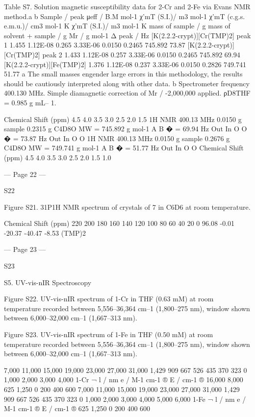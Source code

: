 Table S7. Solution magnetic susceptibility data for 2-Cr and 2-Fe via Evans NMR method.a 
b Sample / peak 
μeff / B.M 
mol-1 
χ'mT (S.I.)/ 
m3 mol-1 
χ'mT (c.g.s. e.m.u.)/ 
cm3 mol-1 K 
χ'mT (S.I.)/ m3 
mol-1 K 
mass of 
sample / g 
mass of solvent 
+ sample / g 
Mr / g 
mol-1 
Δ peak / 
Hz 
[K(2.2.2-crypt)][Cr(TMP)2] peak 1 
1.455 
1.12E-08 
0.265 
3.33E-06 
0.0150 
0.2465 
745.892 
73.87 
[K(2.2.2-crypt)][Cr(TMP)2] peak 2 
1.433 
1.12E-08 
0.257 
3.33E-06 
0.0150 
0.2465 
745.892 
69.94 
[K(2.2.2-crypt)][Fe(TMP)2] 
1.376 
1.12E-08 
0.237 
3.33E-06 
0.0150 
0.2826 
749.741 
51.77 
a The small masses engender large errors in this methodology, the results should be cautiously interpreted along with other 
data. b Spectrometer frequency 400.130 MHz. Simple diamagnetic correction of Mr / -2,000,000 applied. ρD8THF = 0.985 g mL–
1. 
 
Chemical Shift (ppm)
4.5
4.0
3.5
3.0
2.5
2.0
1.5
1H NMR 400.13 MHz
0.0150 g sample
0.2315 g C4D8O
MW = 745.892 g mol-1
A
B
� = 69.94 Hz
Out
In
O
O
� = 73.87 Hz
Out
In
O
O
1H NMR 400.13 MHz
0.0150 g sample
0.2676 g C4D8O
MW = 749.741 g mol-1
A
B
� = 51.77 Hz
Out
In
O
O
Chemical Shift (ppm)
4.5
4.0
3.5
3.0
2.5
2.0
1.5
1.0


--- Page 22 ---
 
 
S22 
 
 
 
Figure S21. 31P{1H} NMR spectrum of crystals of 7 in C6D6 at room temperature. 
 
 
Chemical Shift (ppm)
220
200
180
160
140
120
100
80
60
40
20
0
96.08
-0.01
-20.37
-40.47
-8.53
(TMP)2


--- Page 23 ---
 
 
S23 
 
 
S5. UV-vis-nIR Spectroscopy 
 
Figure S22. UV-vis-nIR spectrum of 1-Cr in THF (0.63 mM) at room temperature recorded between 5,556–36,364 cm–1 
(1,800–275 nm), window shown between 6,000–32,000 cm–1 (1,667–313 nm). 
 
 
Figure S23. UV-vis-nIR spectrum of 1-Fe in THF (0.50 mM) at room temperature recorded between 5,556–36,364 cm–1 
(1,800–275 nm), window shown between 6,000–32,000 cm–1 (1,667–313 nm). 
 
7,000
11,000
15,000
19,000
23,000
27,000
31,000
1,429
909
667
526
435
370
323
0
1,000
2,000
3,000
4,000
1-Cr
¬ l / nm
e / M-1 cm-1 ®
E / cm-1 ®
16,000
8,000
625
1,250
0
200
400
600
7,000
11,000
15,000
19,000
23,000
27,000
31,000
1,429
909
667
526
435
370
323
0
1,000
2,000
3,000
4,000
5,000
6,000
1-Fe
¬ l / nm
e / M-1 cm-1 ®
E / cm-1 ®
625
1,250
0
200
400
600


